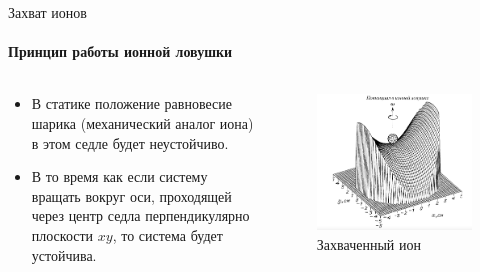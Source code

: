 \documentclass{beamer}
\begin{document}
	\begin{frame}{Захват ионов}
		\framesubtitle{Принцип работы ионной ловушки}
		
		\begin{columns}
			
			\begin{column}{0.5\textwidth}
				
				\begin{itemize}
					\item<2-> В статике положение равновесие шарика (механический аналог иона) в этом седле будет неустойчиво.
					\item<2-> В то время как если систему вращать вокруг оси, проходящей через центр седла перпендикулярно плоскости $xy$, то система
					будет устойчива.
				\end{itemize}
				
			\end{column}
			
			\begin{column}{0.5\textwidth}
				\begin{figure}
					\centering
					\includegraphics[width=\textwidth]{media/trap-potential.png}
					\caption{Захваченный ион}
				\end{figure}
			\end{column}
			
		\end{columns}
		
	\end{frame}
\end{document}

